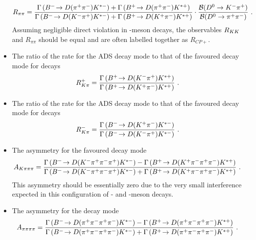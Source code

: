 \begin{itemize}
{{\footnotesize
\begin{equation}
R_{\pi\pi} = \frac{\Gamma\left({{{B}^-}}\!\rightarrow {\ensuremath{D}}({{\pi}^+}{{\pi}^-}){{K}^{*-}}\right) + \Gamma\left({{{B}^+}}\!\rightarrow {\ensuremath{D}}({{\pi}^+}{{\pi}^-}){{K}^{*+}}\right)}{\Gamma\left({{{B}^-}}\!\rightarrow {\ensuremath{D}}({{K}^-}{{\pi}^+}){{K}^{*-}}\right) + \Gamma\left({{{B}^+}}\!\rightarrow {\ensuremath{D}}({{K}^+}{{\pi}^-}){{K}^{*+}}\right)} \cdot \frac{{\mathcal{B}}(D^0 \rightarrow K^-\pi^+)}{{\mathcal{B}}(D^0 \rightarrow \pi^+\pi^-)} \text{ . }
\label{eqn:Rpipi}
\end{equation}}
}
Assuming negligible direct \CP violation in \D-meson decays, the observables $R_{{K}{K}}$ and $R_{\pi\pi}$ should be equal and are often labelled together as $R_{CP+}$.
\item{The ratio of the rate for the ADS decay mode to that of the favoured decay mode for \Bp decays
{\footnotesize
\begin{equation}
R^+_{K\pi} = \frac{\Gamma\left({{{B}^+}}\!\rightarrow {\ensuremath{D}}({{K}^-}{{\pi}^+}){{K}^{*+}}\right)}{\Gamma\left({{{B}^+}}\!\rightarrow {\ensuremath{D}}({{K}^+}{{\pi}^-}){{K}^{*+}}\right)} \text{ . }
\label{eqn:Rplus}
\end{equation}
}}
\item{The ratio of the rate for the ADS decay mode to that of the favoured decay mode for \Bm decays
{\footnotesize
\begin{equation}
R^-_{K\pi} = \frac{\Gamma\left({{{B}^-}}\!\rightarrow {\ensuremath{D}}({{K}^+}{{\pi}^-}){{K}^{*-}}\right)}{\Gamma\left({{{B}^-}}\!\rightarrow {\ensuremath{D}}({{K}^-}{{\pi}^+}){{K}^{*-}}\right)} \text{ . }
\label{eqn:Rminus}
\end{equation}
}}
\item{The \CP asymmetry for the favoured \decay{\Dz}{\Km\pip\pim\pip} decay mode
{\footnotesize
\begin{equation}
A_{{K}\pi\pi\pi} = \frac{\Gamma\left({{{B}^-}}\!\rightarrow {\ensuremath{D}}({{K}^-}{{\pi}^+}{{\pi}^-}{{\pi}^+}){{K}^{*-}}\right) - \Gamma\left({{{B}^+}}\!\rightarrow {\ensuremath{D}}({{K}^+}{{\pi}^-}{{\pi}^+}{{\pi}^-}){{K}^{*+}}\right)}{\Gamma\left({{{B}^-}}\!\rightarrow {\ensuremath{D}}({{K}^-}{{\pi}^+}{{\pi}^-}{{\pi}^+}){{K}^{*-}}\right) + \Gamma\left({{{B}^+}}\!\rightarrow {\ensuremath{D}}({{K}^+}{{\pi}^-}{{\pi}^+}{{\pi}^-}){{K}^{*+}}\right)} \text{ . }
\label{eqn:Akpipipi}
\end{equation}}%
\noindent%
This asymmetry should be essentially zero due to the very small interference expected in this configuration of \B- and \D-meson decays.
}
\item{The \CP asymmetry for the \decay{\D}{\pip\pim\pip\pim} decay mode
{\footnotesize
\begin{equation}
A_{\pi\pi\pi\pi} = \frac{\Gamma\left(\decay{\Bm}{\D(\pip\pim\pip\pim)\Kstarm}\right) - \Gamma\left(\decay{\Bp}{\D(\pip\pim\pip\pim)\Kstarp}\right)}{\Gamma\left(\decay{\Bm}{\D(\pip\pim\pip\pim)\Kstarm}\right) + \Gamma\left(\decay{\Bp}{\D(\pip\pim\pip\pim)\Kstarp}\right)} \text{ . }

\end{equation}}}
\end{itemize}
